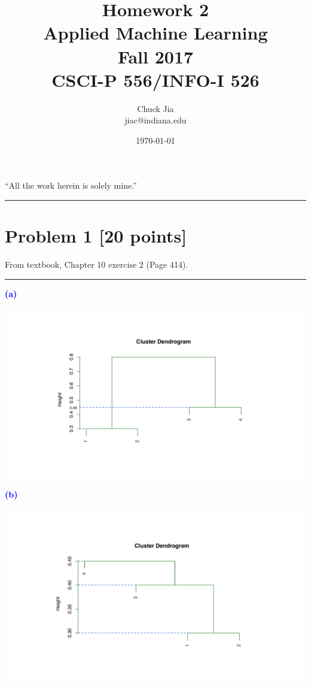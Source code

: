 \documentclass[a4paper,12pt]{article}
\newcommand{\quotes}[1]{``#1''}
\newcommand{\qnum}[1]{\noindent\textcolor{blue}{\textbf{(#1)}}}
\newcommand{\sep}{\begin{center}\textcolor{gray}{\rule{\textwidth}{0.75pt}}\end{center}}
\begin{document}
\title{Homework 2\\ Applied Machine Learning \\ Fall 2017\\ CSCI-P 556/INFO-I 526}         %
  \author{Chuck Jia\\ jiac@indiana.edu}       %
\date{\today}          %
\maketitle
\quotes{All the work herein is solely mine.}
\makeatother     %
\pagestyle{plain}





\begin{center}
\rule{\textwidth}{2pt}
\end{center}
 
\section*{Problem 1 [20 points]} 

From textbook,  Chapter 10 exercise 2 (Page 414).
\sep 

\qnum{a}
\begin{center}
  \includegraphics[width=0.75\linewidth]{Image/Prob1a.pdf}
\end{center}
\bigskip





\qnum{b}
\begin{center}
  \includegraphics[width=0.75\linewidth]{Image/Prob1b.pdf}
\end{center}
\bigskip
\end{document}

